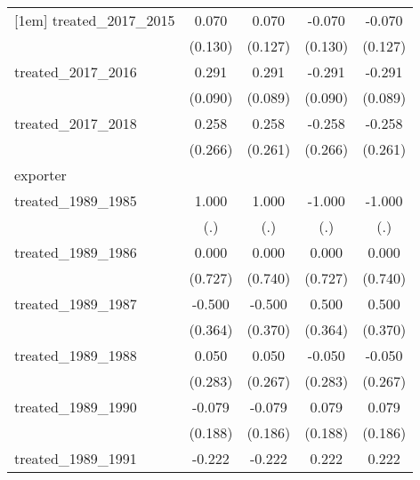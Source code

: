 {\begin{tabular}{l*{4}{c}}
[1em]
treated\_2017\_2015&       0.070         &       0.070         &      -0.070         &      -0.070         \\
            &     (0.130)         &     (0.127)         &     (0.130)         &     (0.127)         \\
[1em]
treated\_2017\_2016&       0.291\sym{**} &       0.291\sym{**} &      -0.291\sym{**} &      -0.291\sym{**} \\
            &     (0.090)         &     (0.089)         &     (0.090)         &     (0.089)         \\
[1em]
treated\_2017\_2018&       0.258         &       0.258         &      -0.258         &      -0.258         \\
            &     (0.266)         &     (0.261)         &     (0.266)         &     (0.261)         \\
\hline
exporter    &                     &                     &                     &                     \\
treated\_1989\_1985&       1.000         &       1.000         &      -1.000         &      -1.000         \\
            &         (.)         &         (.)         &         (.)         &         (.)         \\
[1em]
treated\_1989\_1986&       0.000         &       0.000         &       0.000         &       0.000         \\
            &     (0.727)         &     (0.740)         &     (0.727)         &     (0.740)         \\
[1em]
treated\_1989\_1987&      -0.500         &      -0.500         &       0.500         &       0.500         \\
            &     (0.364)         &     (0.370)         &     (0.364)         &     (0.370)         \\
[1em]
treated\_1989\_1988&       0.050         &       0.050         &      -0.050         &      -0.050         \\
            &     (0.283)         &     (0.267)         &     (0.283)         &     (0.267)         \\
[1em]
treated\_1989\_1990&      -0.079         &      -0.079         &       0.079         &       0.079         \\
            &     (0.188)         &     (0.186)         &     (0.188)         &     (0.186)         \\
[1em]
treated\_1989\_1991&      -0.222         &      -0.222         &       0.222         &       0.222         \\

\end{tabular}}
